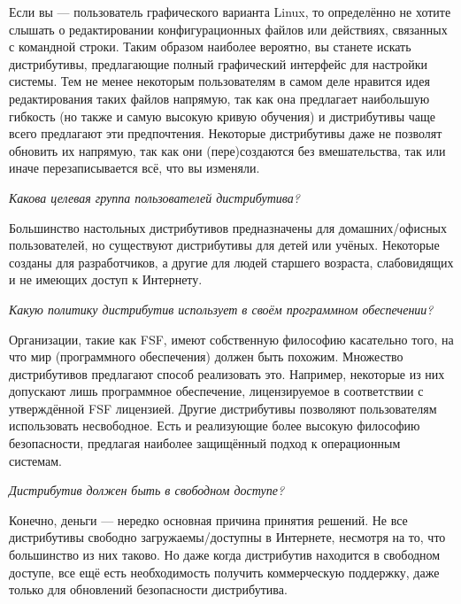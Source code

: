 \documentclass[10pt]{book}
\begin{document}
Если вы --- пользователь графического варианта Linux, то определённо не хотите слышать о редактировании конфигурационных файлов или действиях, связанных с командной строки. Таким образом наиболее вероятно, вы станете искать дистрибутивы, предлагающие полный графический интерфейс для настройки системы. Тем не менее некоторым пользователям в самом деле нравится идея редактирования таких файлов напрямую, так как она предлагает наибольшую гибкость (но также и самую высокую кривую обучения) и дистрибутивы чаще всего предлагают эти предпочтения. Некоторые дистрибутивы даже не позволят обновить их напрямую, так как они  (пере)создаются без вмешательства, так или иначе перезаписывается всё, что вы изменяли.

\begin{flushright}
{\color{gentoo}\emph{Какова целевая группа пользователей дистрибутива?}}
\end{flushright}

Большинство настольных дистрибутивов предназначены для домашних/офисных пользователей, но существуют дистрибутивы для детей или учёных. Некоторые созданы для разработчиков, а другие для людей старшего возраста, слабовидящих и не имеющих доступ к Интернету.

\begin{flushright}
{\color{gentoo}\emph{Какую политику дистрибутив использует в своём программном обеспечении?}}
\end{flushright}

Организации, такие как FSF, имеют собственную философию касательно того, на что мир (программного обеспечения) должен быть похожим. Множество дистрибутивов предлагают способ реализовать это. Например, некоторые из них допускают лишь программное обеспечение, лицензируемое в соответствии с утверждённой FSF лицензией. Другие дистрибутивы позволяют пользователям использовать несвободное. Есть и реализующие более высокую философию безопасности, предлагая наиболее защищённый подход к операционным системам.

\begin{flushright}
{\color{gentoo}\emph{Дистрибутив должен быть в свободном доступе?}}
\end{flushright}

Конечно, деньги --- нередко основная причина принятия решений. Не все дистрибутивы свободно загружаемы/доступны в Интернете, несмотря на то, что большинство из них таково. Но даже когда дистрибутив находится в свободном доступе, все ещё есть необходимость получить коммерческую поддержку, даже только для обновлений безопасности дистрибутива.
\end{document}
